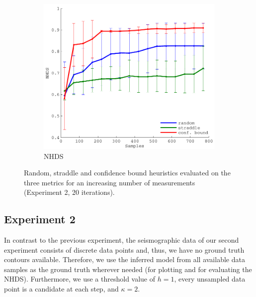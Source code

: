 \documentclass[11pt]{article} %
\begin{document}
\begin{figure}[h!]
  \hfill
  \begin{subfigure}[b]{0.329\textwidth}
    \centering
    \includegraphics[width=\textwidth]{figures/quake_hd}
    \caption{NHDS}
  \end{subfigure}
  \caption{Random, straddle and confidence bound heuristics evaluated on the three
           metrics for an increasing number of measurements
           (Experiment 2, 20 iterations).}
  \label{fig:quake_eval}
\end{figure}

\subsection{Experiment 2}
In contrast to the previous experiment, the seismographic data of our second
experiment consists of discrete data points and, thus, we have no ground
truth contours available. Therefore, we use the inferred model from all
available data samples as the ground truth wherever needed (for plotting and
for evaluating the NHDS). Furthermore, we use a threshold value of $h = 1$, every
unsampled data point is a candidate at each step, and $\kappa = 2$.
\end{document}
